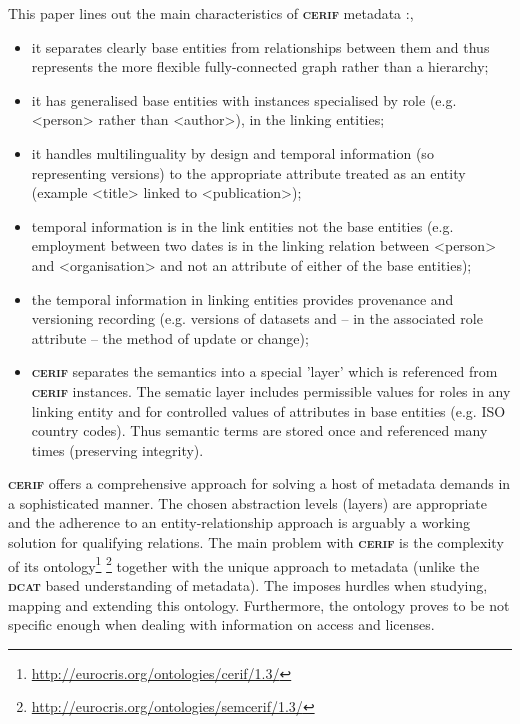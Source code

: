 \documentclass[a4paper,english,twoside,BCOR1.5cm,headsepline,DIV12,appendixprefix,final,12pt]{scrbook}
\newcommand{\dcat}{{\scshape\bfseries dcat}\xspace}
\newcommand{\cerif}{{\scshape\bfseries cerif}\xspace}
\newcommand{\prop}[1]{{{\texttt{#1}}}}
\newcommand\footnoteurl[1]{\footnote{\scriptsize\url{#1}}}
\begin{document}
This paper lines out the main characteristics of \cerif metadata \cite{jefferyCerifW3C2016}:,
\begin{itemize}
\item it separates clearly base entities from relationships between them and thus represents the more
flexible fully-connected graph rather than a hierarchy;
\item it has generalised base entities with instances specialised by role (e.g. <person> rather
than <author>), in the linking entities;
\item it handles multilinguality by design and temporal information (so representing versions)
to the appropriate attribute treated as an entity (example <title> linked to <publication>);
\item temporal information is in the link entities not the base entities (e.g. employment between
two dates is in the linking relation between <person> and <organisation> and not an attribute of either
of the base entities);
\item the temporal information in linking entities provides provenance and versioning recording (e.g.
versions of datasets and – in the associated role attribute – the method of update or change);
\item \cerif separates the semantics into a special 'layer' which is referenced from \cerif instances. The
sematic layer includes permissible values for roles in any linking entity and for controlled
values of attributes in base entities (e.g. ISO country codes). Thus semantic terms are stored once and
referenced many times (preserving integrity). 
\end{itemize}

\cerif offers a comprehensive approach for solving a host of metadata demands in a sophisticated manner. 
The chosen abstraction levels (layers) are appropriate and the adherence to an entity-relationship approach is arguably a working solution for qualifying relations. The main problem with \cerif is the complexity of its ontology\footnoteurl{http://eurocris.org/ontologies/cerif/1.3/} \footnoteurl{http://eurocris.org/ontologies/semcerif/1.3/} together with the unique approach to metadata (unlike the \dcat based understanding of metadata). The imposes hurdles when studying, mapping and extending this ontology. 
Furthermore, the ontology proves to be not specific enough when dealing with information on access and licenses.
\end{document}
